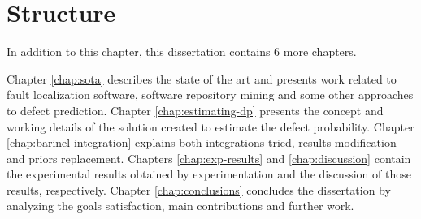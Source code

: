 \section{Structure} \label{sec:struct}

In addition to this chapter, this dissertation contains 6 more chapters.

Chapter \ref{chap:sota} describes the state of the art and presents work related to fault localization software, software repository mining and some other approaches to defect prediction. Chapter \ref{chap:estimating-dp} presents the concept and working details of the solution created to estimate the defect probability. Chapter \ref{chap:barinel-integration} explains both integrations tried, results modification and priors replacement. Chapters \ref{chap:exp-results} and \ref{chap:discussion} contain the experimental results obtained by experimentation and the discussion of those results, respectively. Chapter \ref{chap:conclusions} concludes the dissertation by analyzing the goals satisfaction, main contributions and further work.

